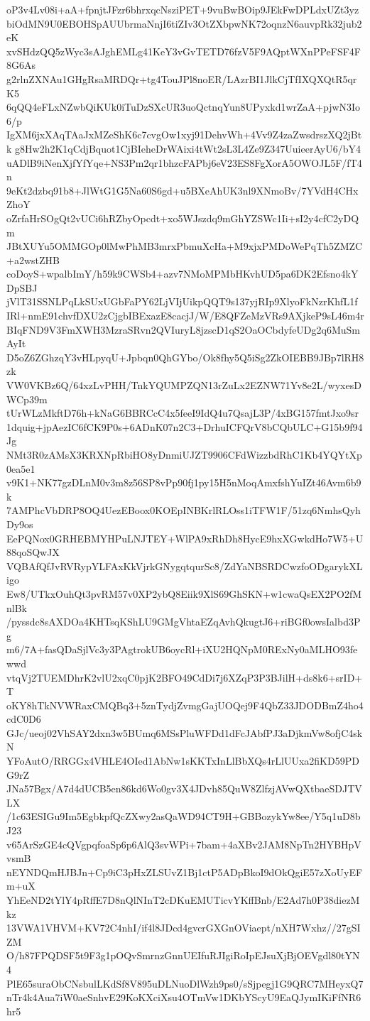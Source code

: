 oP3v4Lv08i+aA+fpnjtJFzr6bhrxqcNsziPET+9vuBwBOip9JEkFwDPLdxUZt3yz
biOdMN9U0EBOHSpAUUbrmaNnjI6tiZIv3OtZXbpwNK72oqnzN6auvpRk32jub2eK
xvSHdzQQ5zWyc3sAJghEMLg41KeY3vGvTETD76fzV5F9AQptWXnPPeFSF4F8G6As
g2rlnZXNAu1GHgRsaMRDQr+tg4TouJPl8noER/LAzrBI1JlkCjTfIXQXQtR5qrK5
6qQQ4eFLxNZwbQiKUk0iTuDzSXcUR3uoQctnqYun8UPyxkd1wrZaA+pjwN3Io6/p
IgXM6jxXAqTAaJxMZeShK6c7cvgOw1xyj91DehvWh+4Vv9Z4zaZwsdrszXQ2jBtk
g8Hw2h2K1qCdjBquot1CjBIeheDrWAixi4tWt2sL3L4Ze9Z347UuieerAyU6/bY4
uADlB9iNenXjfYfYqe+NS3Pm2qr1bhzcFAPbj6eV23ES8FgXorA5OWOJL5F/fT4n
9eKt2dzbq91b8+JlWtG1G5Na60S6gd+u5BXeAhUK3nl9XNmoBv/7YVdH4CHxZhoY
oZrfaHrSOgQt2vUCi6hRZbyOpcdt+xo5WJszdq9mGhYZSWc1Ii+sI2y4cfC2yDQm
JBtXUYu5OMMGOp0lMwPhMB3mrxPbmuXcHa+M9xjxPMDoWePqTh5ZMZC+a2wstZHB
coDoyS+wpalbImY/h59k9CWSb4+azv7NMoMPMbHKvhUD5pa6DK2Efsno4kYDpSBJ
jVlT31SSNLPqLkSUxUGbFaPY62LjVIjUikpQQT9s137yjRIp9XlyoFkNzrKhfL1f
IRl+nmE91chvfDXU2zCjgbIBExazE8cacjJ/W/E8QFZeMzVRs9AXjkeP9sL46m4r
BIqFND9V3FmXWH3MzraSRvn2QVIuryL8jzscD1qS2OaOCbdyfeUDg2q6MuSmAyIt
D5oZ6ZGhzqY3vHLpyqU+Jpbqn0QhGYbo/Ok8fhy5Q5iSg2ZkOIEBB9JBp7lRH8zk
VW0VKBz6Q/64xzLvPHH/TnkYQUMPZQN13rZuLx2EZNW71Yv8e2L/wyxesDWCp39m
tUrWLzMkftD76h+kNaG6BBRCcC4x5feeI9IdQ4u7QsajL3P/4xBG157fmtJxo9sr
1dquig+jpAezIC6fCK9P0s+6ADnK07n2C3+DrhuICFQrV8bCQbULC+G15b9f94Jg
NMt3R0zAMsX3KRXNpRbiHO8yDnmiUJZT9906CFdWizzbdRhC1Kb4YQYtXp0ea5e1
v9K1+NK77gzDLnM0v3m8z56SP8vPp90fj1py15H5nMoqAmxfshYuIZt46Avm6b9k
7AMPhcVbDRP8OQ4UezEBoox0KOEpINBKrlRLOss1iTFW1F/51zq6NmhsQyhDy9os
EePQNox0GRHEBMYHPuLNJTEY+WlPA9xRhDh8HycE9hxXGwkdHo7W5+U88qoSQwJX
VQBAfQfJvRVRypYLFAxKkVjrkGNygqtqurSc8/ZdYaNBSRDCwzfoODgarykXLigo
Ew8/UTkxOuhQt3pvRM57v0XP2ybQ8Eiik9XlS69GhSKN+w1cwaQsEX2PO2fMnlBk
/pyssdc8sAXDOa4KHTsqKShLU9GMgVhtaEZqAvhQkugtJ6+riBGf0owsIalbd3Pg
m6/7A+fasQDaSjlVc3y3PAgtrokUB6oycRl+iXU2HQNpM0RExNy0aMLHO93fewwd
vtqVj2TUEMDhrK2vlU2xqC0pjK2BFO49CdDi7j6XZqP3P3BJilH+ds8k6+srID+T
oKY8hTkNVWRaxCMQBq3+5znTydjZvmgGajUOQej9F4QbZ33JDODBmZ4ho4cdC0D6
GJc/ueoj02VhSAY2dxn3w5BUmq6MSsPluWFDd1dFcJAbfPJ3aDjkmVw8ofjC4skN
YFoAutO/RRGGx4VHLE4OIed1AbNw1sKKTxInLlBbXQs4rLlUUxa2fiKD59PDG9rZ
JNa57Bgx/A7d4dUCB5en86kd6Wo0gv3X4JDvh85QuW8ZlfzjAVwQXtbaeSDJTVLX
/1c63ESIGu9Im5EgbkpfQcZXwy2asQaWD94CT9H+GBBozykYw8ee/Y5q1uD8bJ23
v65ArSzGE4cQVgpqfoaSp6p6AlQ3svWPi+7bam+4aXBv2JAM8NpTn2HYBHpVvsmB
nEYNDQmHJBJn+Cp9iC3pHxZLSUvZ1Bj1ctP5ADpBkoI9dOkQgiE57zXoUyEFm+uX
YhEeND2tYlY4pRffE7D8nQlNInT2cDKuEMUTicvYKffBnb/E2Ad7h0P38diezMkz
13VWA1VHVM+KV72C4nhI/if4l8JDcd4gvcrGXGnOViaept/nXH7Wxhz//27gSIZM
O/h87FPQDSF5t9F3g1pOQvSmrnzGnnUEIfuRJIgiRoIpEJsuXjBjOEVgdl80tYN4
PlE65suraObCNsbulLKdSf8V895uDLNuoDlWzh9ps0/sSjpegj1G9QRC7MHeyxQ7
nTr4k4Aua7iW0aeSnhvE29KoKXciXsu4OTmVw1DKbYScyU9EaQJymIKiFfNR6hr5
